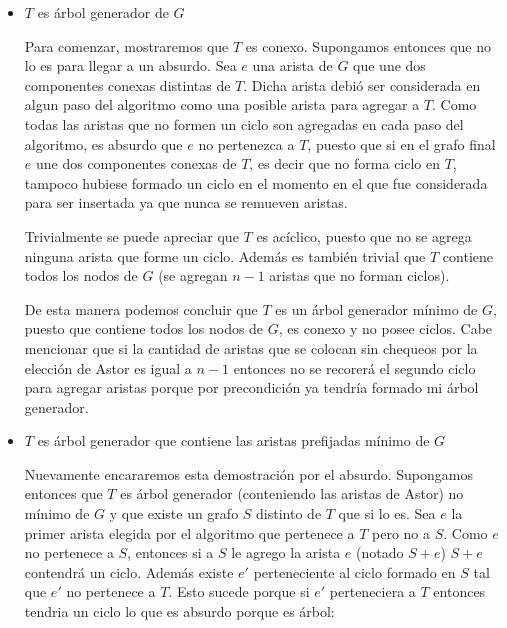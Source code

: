 \documentclass[a4paper,11pt] {article}
\begin{document}
\begin{itemize}
\item $T$ es \'arbol generador de $G$

Para comenzar, mostraremos que $T$ es conexo. Supongamos entonces que no lo es para llegar a un absurdo. Sea $e$ una arista de $G$ que une dos componentes conexas distintas de $T$. Dicha arista debi\'o ser considerada en algun paso del algoritmo como una posible arista para agregar a $T$. Como todas las aristas que no formen un ciclo son agregadas en cada paso del algoritmo, es absurdo que $e$ no pertenezca a $T$, puesto que si en el grafo final $e$ une dos componentes conexas de $T$, es decir que no forma ciclo en $T$, tampoco hubiese formado un ciclo en el momento en el que fue considerada para ser insertada ya que nunca se remueven aristas.

Trivialmente se puede apreciar que $T$ es ac\'iclico, puesto que no se agrega ninguna arista que forme un ciclo. Adem\'as es tambi\'en trivial que $T$ contiene todos los nodos de $G$ (se agregan $n-1$ aristas que no forman ciclos).

De esta manera podemos concluir que $T$ es un \'arbol generador m\'inimo de $G$, puesto que contiene todos los nodos de $G$, es conexo y no posee ciclos. Cabe mencionar que si la cantidad de aristas que se colocan sin chequeos por la elecci\'on de Astor es igual a $n-1$ entonces no se recorer\'a el segundo ciclo para agregar aristas porque por precondici\'on ya tendr\'ia formado mi \'arbol generador.

\item $T$ es \'arbol generador que contiene las aristas prefijadas m\'inimo de $G$

Nuevamente encararemos esta demostraci\'on por el absurdo. Supongamos entonces que $T$ es \'arbol generador (conteniendo las aristas de Astor) no m\'inimo de $G$ y que existe un grafo $S$ distinto de $T$ que si lo es. Sea $e$ la primer arista elegida por el algoritmo que pertenece a $T$ pero no a $S$. Como $e$ no pertenece a $S$, entonces si a $S$ le agrego la arista $e$ (notado $S+e$) $S+e$ contendr\'a un ciclo. Adem\'as existe $e'$ perteneciente al ciclo formado en $S$ tal que $e'$ no pertenece a $T$. Esto sucede porque si $e'$ perteneciera a $T$ entonces tendria un ciclo lo que es absurdo porque es \'arbol:


\end{itemize}
\end{document}

